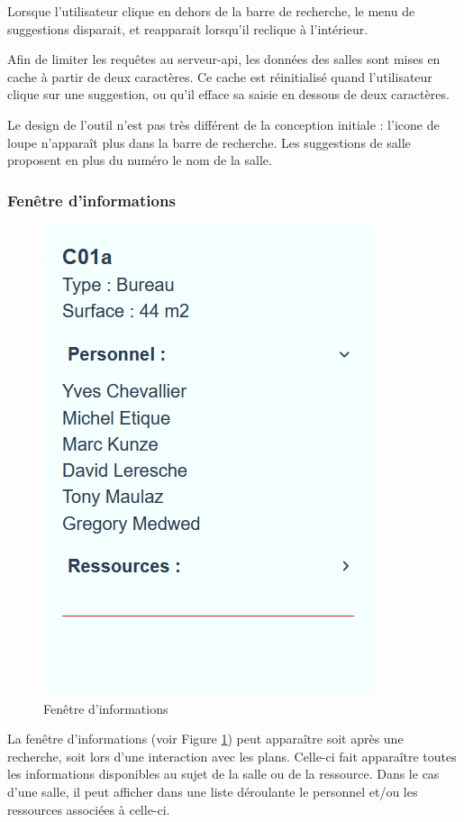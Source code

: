 \documentclass[
    iai, %
    il, %
]{heig-tb}
\begin{document}
Lorsque l'utilisateur clique en dehors de la barre de recherche, le menu de suggestions disparait,
et reapparait lorsqu'il reclique à l'intérieur.

Afin de limiter les requêtes au serveur-api, les données des salles sont mises en cache à partir de deux caractères.
Ce cache est réinitialisé quand l'utilisateur clique sur une suggestion, ou qu'il efface sa saisie en dessous de deux caractères.

Le design de l'outil n'est pas très différent de la conception initiale : l'icone de loupe n'apparaît plus dans la barre de recherche.
Les suggestions de salle proposent en plus du numéro le nom de la salle.

\subsubsection{Fenêtre d'informations}

\begin{figure}[h]
    \centering
    \includegraphics[scale=0.5]{frontend-info.png}
    \caption{Fenêtre d'informations}
    \label{fig:info}
\end{figure}

La fenêtre d'informations (voir Figure \ref{fig:info}) peut apparaître soit après une recherche, soit lors d'une interaction avec les plans.
Celle-ci fait apparaître toutes les informations disponibles au sujet de la salle ou de la ressource.
Dans le cas d'une salle, il peut afficher dans une liste déroulante le personnel
et/ou les ressources associées à celle-ci.
\end{document}

